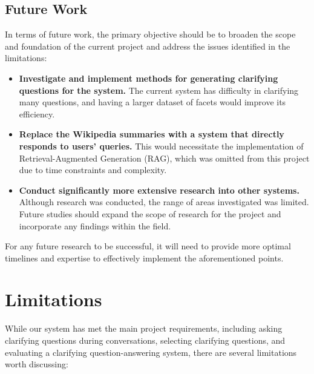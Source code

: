 \documentclass[11pt]{article}
\begin{document}
\subsection{Future Work}
In terms of future work, the primary objective should be to broaden the scope and foundation of the current project and address the issues identified in the limitations:

\begin{itemize}
    \item \textbf{Investigate and implement methods for generating clarifying questions for the system.} The current system has difficulty in clarifying many questions, and having a larger dataset of facets would improve its efficiency.
    
    \item \textbf{Replace the Wikipedia summaries with a system that directly responds to users' queries.} This would necessitate the implementation of Retrieval-Augmented Generation (RAG), which was omitted from this project due to time constraints and complexity.
    
    \item \textbf{Conduct significantly more extensive research into other systems.} Although research was conducted, the range of areas investigated was limited. Future studies should expand the scope of research for the project and incorporate any findings within the field.
\end{itemize}

For any future research to be successful, it will need to provide more optimal timelines and expertise to effectively implement the aforementioned points.


\section*{Limitations}
While our system has met the main project requirements, including asking clarifying questions during conversations, selecting clarifying questions, and evaluating a clarifying question-answering system, there are several limitations worth discussing:
\end{document}
